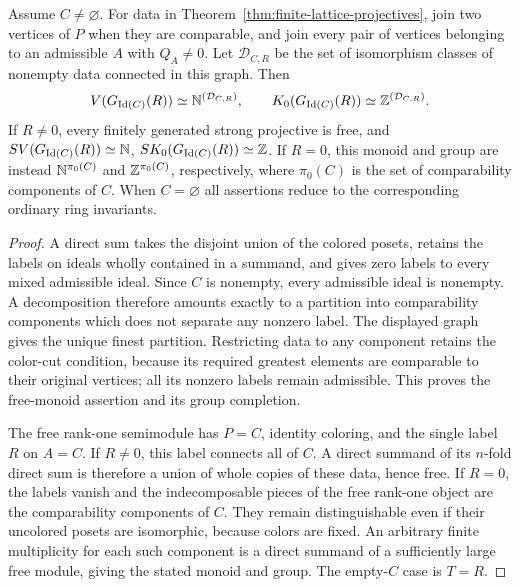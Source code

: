 \begin{corollary}
\label{cor:lattice-projective-Kzero}
Assume $C\ne\varnothing$. For data in
Theorem~\ref{thm:finite-lattice-projectives}, join two vertices of $P$
when they are comparable, and join every pair of vertices belonging
to an admissible $A$ with $Q_A\ne0$. Let $\mathcal D_{C,R}$ be the set
of isomorphism classes of nonempty data connected in this graph.
Then
\[
 V(G_{\operatorname{Id}(C)}(R))\simeq\mathbb N^{(\mathcal D_{C,R})},\qquad
 K_0(G_{\operatorname{Id}(C)}(R))\simeq\mathbb Z^{(\mathcal D_{C,R})}.
\]
If $R\ne0$, every finitely generated strong projective is free, and
$SV(G_{\operatorname{Id}(C)}(R))\simeq\mathbb N$, $SK_0(G_{\operatorname{Id}(C)}(R))\simeq\mathbb Z$.
If $R=0$, this monoid and group are instead
$\mathbb N^{\pi_0(C)}$ and $\mathbb Z^{\pi_0(C)}$, respectively, where $\pi_0(C)$
is the set of comparability components of $C$. When $C=\varnothing$
all assertions reduce to the corresponding ordinary ring invariants.
\end{corollary}
\begin{proof}
A direct sum takes the disjoint union of the colored posets, retains
the labels on ideals wholly contained in a summand, and gives zero
labels to every mixed admissible ideal. Since $C$ is nonempty,
every admissible ideal is nonempty. A decomposition therefore amounts
exactly to a partition into comparability components which does not
separate any nonzero label. The displayed graph gives the unique
finest partition. Restricting data to any component retains the
color-cut condition, because its required greatest elements are
comparable to their original vertices; all its nonzero labels remain
admissible. This proves the free-monoid assertion and its group
completion.

The free rank-one semimodule has $P=C$, identity coloring, and the
single label $R$ on $A=C$. If $R\ne0$, this label connects all of $C$.
A direct summand of its $n$-fold direct sum is therefore a union of
whole copies of these data, hence free. If $R=0$, the labels vanish
and the indecomposable pieces of the free rank-one object are the
comparability components of $C$. They remain distinguishable even
if their uncolored posets are isomorphic, because colors are fixed.
An arbitrary finite multiplicity for each such component is a direct
summand of a sufficiently large free module, giving the stated
monoid and group. The empty-$C$ case is $T=R$.
\end{proof}
